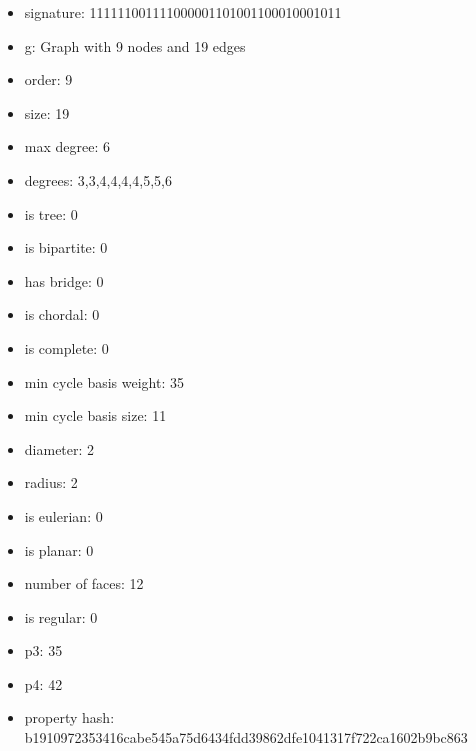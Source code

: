 \newpage
\begin{figure}
\end{figure}
\begin{itemize}
\item signature: 111111001111000001101001100010001011
\item g: Graph with 9 nodes and 19 edges
\item order: 9
\item size: 19
\item max degree: 6
\item degrees: 3,3,4,4,4,4,5,5,6
\item is tree: 0
\item is bipartite: 0
\item has bridge: 0
\item is chordal: 0
\item is complete: 0
\item min cycle basis weight: 35
\item min cycle basis size: 11
\item diameter: 2
\item radius: 2
\item is eulerian: 0
\item is planar: 0
\item number of faces: 12
\item is regular: 0
\item p3: 35
\item p4: 42
\item property hash: b1910972353416cabe545a75d6434fdd39862dfe1041317f722ca1602b9bc863
\end{itemize}

